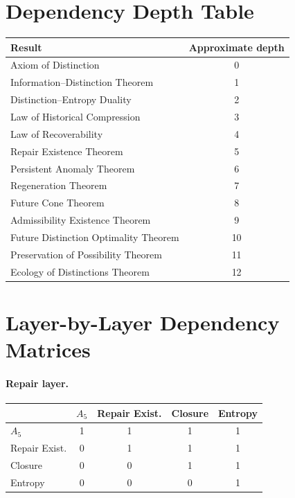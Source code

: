 \documentclass[12pt,twoside,openright]{book}
\begin{document}
\section{Dependency Depth Table}

\begin{center}
\begin{tabular}{lc}
\toprule
Result & Approximate depth \\
\midrule
Axiom of Distinction & 0 \\
Information--Distinction Theorem & 1 \\
Distinction--Entropy Duality & 2 \\
Law of Historical Compression & 3 \\
Law of Recoverability & 4 \\
Repair Existence Theorem & 5 \\
Persistent Anomaly Theorem & 6 \\
Regeneration Theorem & 7 \\
Future Cone Theorem & 8 \\
Admissibility Existence Theorem & 9 \\
Future Distinction Optimality Theorem & 10 \\
Preservation of Possibility Theorem & 11 \\
Ecology of Distinctions Theorem & 12 \\
\bottomrule
\end{tabular}
\end{center}

\section{Layer-by-Layer Dependency Matrices}

\paragraph{Repair layer.}
\begin{center}
\begin{tabular}{lcccc}
\toprule
& $A_5$ & Repair Exist. & Closure & Entropy \\
\midrule
$A_5$ & 1&1&1&1 \\
Repair Exist. & 0&1&1&1 \\
Closure & 0&0&1&1 \\
Entropy & 0&0&0&1 \\
\bottomrule
\end{tabular}
\end{center}
\end{document}
